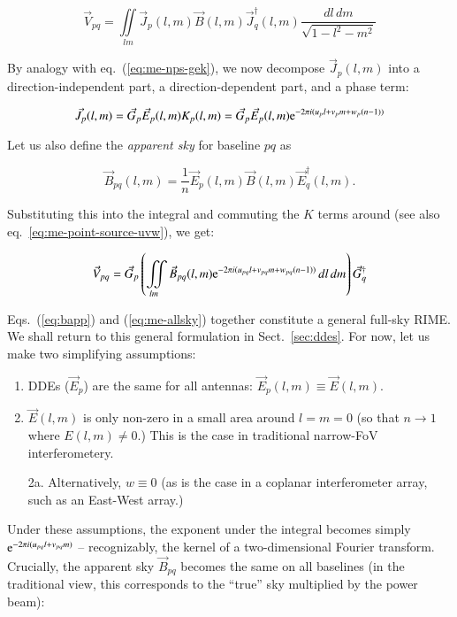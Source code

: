 \documentclass[]{aa}
\begin{document}
\[
\vec V_{pq} = \iint\limits_{lm} \vec J_p(l,m) \vec B(l,m) \vec J^\dagger_q(l,m) \frac{dl\,dm}{\sqrt{1-l^2-m^2}}
\]

By analogy with eq.~(\ref{eq:me-nps-gek}), we now decompose $\vec J_p(l,m)$ into a direction-independent part, a direction-dependent part, and a phase term:

\[
\vec J_p(l,m) = \vec G_p\vec E_p(l,m) K_p(l,m) = \vec G_p\vec E_p(l,m) {\rm e}^{-2\pi i(u_p l+v_p m+w_p (n-1))}
\]

Let us also define the {\em apparent sky} for baseline $pq$ as

\begin{equation}\label{eq:bapp}
\vec B_{pq}(l,m) = \frac{1}{n} \vec E_p(l,m)  \vec B(l,m) \vec E^\dagger_q(l,m).
\end{equation}

Substituting this into the integral and commuting the $K$ terms around (see also eq.~\ref{eq:me-point-source-uvw}), we get:

\begin{equation}\label{eq:me-allsky}
\vec V_{pq} = \vec G_p \left( \iint\limits_{lm} \vec B_{pq}(l,m) {\rm e}^{-2\pi i(u_{pq} l+v_{pq} m+w_{pq} (n-1))} \,dl\,dm \right) \vec G^\dagger_q
\end{equation}

Eqs.~(\ref{eq:bapp}) and (\ref{eq:me-allsky}) together constitute a general full-sky RIME. We shall return to this general formulation in Sect.~\ref{sec:ddes}. For now, let us make two simplifying assumptions:

\begin{enumerate}
\item DDEs ($\vec E_p$) are the same for all antennas: $\vec E_p(l,m) \equiv \vec E(l,m)$. 
\item $\vec E(l,m)$ is only non-zero in a small area around $l=m=0$ (so that $n\to 1$ where $E(l,m) \ne 0.$) This is the case in traditional narrow-FoV interferometery.
\item[2a.] Alternatively, $w\equiv0$ (as is the case in a  coplanar interferometer array, such as an East-West array.)
\end{enumerate}

Under these assumptions, the exponent under the integral becomes simply ${\rm e}^{-2\pi i(u_{pq} l+v_{pq}m)}$ -- recognizably, the kernel of a two-dimensional Fourier transform. Crucially, the apparent sky $\vec B_{pq}$ becomes the same on all baselines (in the traditional view, this corresponds to the ``true'' sky multiplied by the power beam): 
\end{document}

